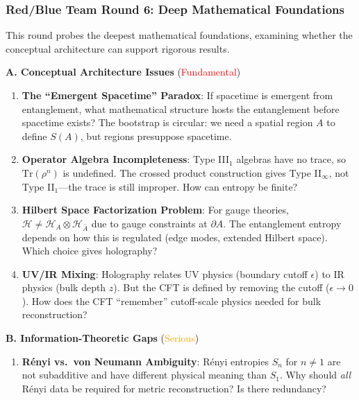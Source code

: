 \documentclass[12pt,a4paper]{article}
\begin{document}
\subsubsection{Red/Blue Team Round 6: Deep Mathematical Foundations}
\label{subsubsec:red-blue-round6}

This round probes the deepest mathematical foundations, examining whether the conceptual architecture can support rigorous results.

\begin{tcolorbox}[colback=red!5!white, colframe=red!75!black, title=\textbf{RED TEAM Round 6: Foundational Critiques}]

\textbf{A. Conceptual Architecture Issues} (\textcolor{red}{Fundamental})

\begin{enumerate}[label=\textbf{R6.\arabic*.}]
    \item \textbf{The ``Emergent Spacetime'' Paradox}: If spacetime is emergent from entanglement, what mathematical structure hosts the entanglement before spacetime exists? The bootstrap is circular: we need a spatial region $A$ to define $S(A)$, but regions presuppose spacetime.
    
    \item \textbf{Operator Algebra Incompleteness}: Type III$_1$ algebras have no trace, so $\text{Tr}(\rho^n)$ is undefined. The crossed product construction gives Type II$_\infty$, not Type II$_1$---the trace is still improper. How can entropy be finite?
    
    \item \textbf{Hilbert Space Factorization Problem}: For gauge theories, $\mathcal{H} \neq \mathcal{H}_A \otimes \mathcal{H}_{\bar{A}}$ due to gauge constraints at $\partial A$. The entanglement entropy depends on how this is regulated (edge modes, extended Hilbert space). Which choice gives holography?
    
    \item \textbf{UV/IR Mixing}: Holography relates UV physics (boundary cutoff $\epsilon$) to IR physics (bulk depth $z$). But the CFT is defined by removing the cutoff ($\epsilon \to 0$). How does the CFT ``remember'' cutoff-scale physics needed for bulk reconstruction?
\end{enumerate}

\textbf{B. Information-Theoretic Gaps} (\textcolor{orange}{Serious})

\begin{enumerate}[resume, label=\textbf{R6.\arabic*.}]
    \item \textbf{R\'enyi vs.\ von Neumann Ambiguity}: R\'enyi entropies $S_n$ for $n \neq 1$ are not subadditive and have different physical meaning than $S_1$. Why should \emph{all} R\'enyi data be required for metric reconstruction? Is there redundancy?
    

\end{enumerate}
\end{tcolorbox}
\end{document}
